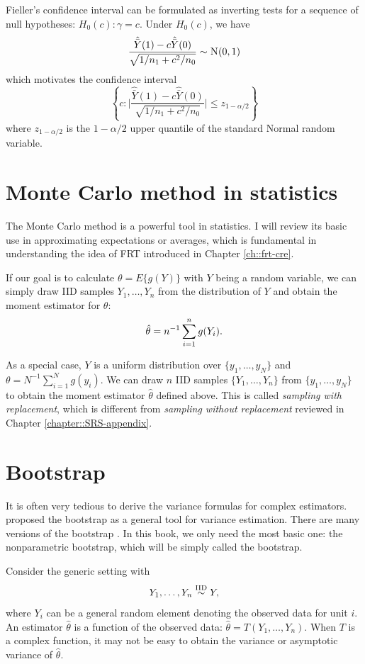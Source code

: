 Fieller's confidence interval can be formulated as inverting tests for a sequence of null hypotheses: $H_0(c): \gamma = c$. Under $H_0(c)$, we have 
$$
\frac{  \hat{\bar{Y}}(1)  - c \hat{\bar{Y}}(0) }{  \sqrt{ 1/n_1 + c^2/n_0  } } \sim \N01 
$$
which motivates the confidence interval
$$
\left\{
c: \Big | \frac{  \hat{\bar{Y}}(1)  - c \hat{\bar{Y}}(0) }{  \sqrt{ 1/n_1 + c^2/n_0  } } \Big | \leq z_{1-\alpha/2}
\right\}
$$
where $z_{1-\alpha/2}$ is the $1-\alpha/2$ upper quantile of the standard Normal random variable.


\section{Monte Carlo method in statistics}\label{sec::monte-carlo-method}


The Monte Carlo method is a powerful tool in statistics. I will review its basic use in approximating expectations or averages, which is fundamental in understanding the idea of FRT  introduced in Chapter \ref{ch::frt-cre}. 


If our goal is to calculate $\theta = E\{  g(Y)\}$ with $Y$ being a random variable, we can simply draw IID samples $Y_1,\ldots, Y_n$ from the distribution of $Y$ and obtain the moment estimator for $\theta$:
$$
\hat\theta = n^{-1} \sum_{i=1}^n g(Y_i).
$$

As a special case, $Y$ is a uniform distribution over $\{ y_1, \ldots, y_N \}$ and $\theta = N^{-1} \sum_{i=1}^N g(y_i)$. We can draw $n$ IID samples $\{ Y_1, \ldots, Y_n \}$ from $\{ y_1, \ldots, y_N \}$ to obtain the moment estimator $\hat\theta $ defined above. This is called {\it sampling with replacement}, which is different from {\it sampling without replacement} reviewed in Chapter \ref{chapter::SRS-appendix}. 



\section{Bootstrap}
\label{sec::bootstrap}


 
It is often very tedious to derive the variance formulas for complex estimators. \citet{Efron_1979} proposed the bootstrap as a general tool for variance estimation.  There are many versions of the bootstrap \citep{davison1997bootstrap}. In this book, we only need the most basic one: the nonparametric bootstrap, which will be simply called the bootstrap. 


Consider the generic setting with 
$$
Y_1,\ldots, Y_n \stackrel{\textup{IID}}{\sim} Y,
$$
where $Y_i$ can be a general random element denoting the observed data for unit $i$. An estimator $\hat\theta$ is a function of the observed data: $\hat\theta = T(Y_1, \ldots, Y_n)$. When $T$ is a complex function, it may not be easy to obtain the variance or asymptotic variance of $\hat\theta$. 

